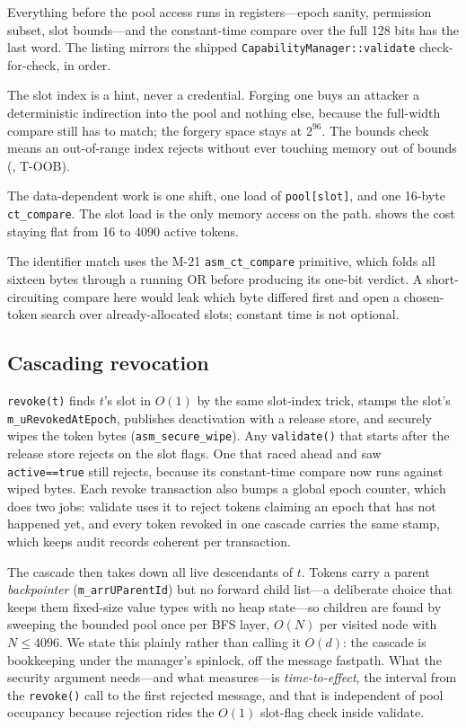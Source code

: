 \noindent
Everything before the pool access runs in registers---epoch sanity,
permission subset, slot bounds---and the constant-time compare over
the full 128 bits has the last word. The listing mirrors the shipped
\texttt{CapabilityManager::validate} check-for-check, in order.

The slot index is a hint, never a credential. Forging one buys an
attacker a deterministic indirection into the pool and nothing else,
because the full-width compare still has to match; the forgery space
stays at $2^{96}$. The bounds check means an out-of-range index
rejects without ever touching memory out of bounds
(, T-OOB).

The data-dependent work is one shift, one load of
\texttt{pool[slot]}, and one 16-byte \texttt{ct\_compare}. The slot
load is the only memory access on the path.
 shows the cost staying flat from 16 to 4090
active tokens.

The identifier match uses the M-21 \texttt{asm\_ct\_compare}
primitive, which folds all sixteen bytes through a running OR before
producing its one-bit verdict. A short-circuiting compare here would
leak which byte differed first and open a chosen-token search over
already-allocated slots; constant time is not optional.

\subsection{Cascading revocation}
\label{sec:design:revoke}

\texttt{revoke(t)} finds $t$'s slot in $O(1)$ by the same slot-index
trick, stamps the slot's \texttt{m\_uRevokedAtEpoch}, publishes
deactivation with a release store, and securely wipes the token bytes
(\texttt{asm\_secure\_wipe}). Any \texttt{validate()} that starts
after the release store rejects on the slot flags. One that raced
ahead and saw \texttt{active==true} still rejects, because its
constant-time compare now runs against wiped bytes. Each revoke
transaction also bumps a global epoch counter, which does two jobs:
validate uses it to reject tokens claiming an epoch that has not
happened yet, and every token revoked in one cascade carries the same
stamp, which keeps audit records coherent per transaction.

The cascade then takes down all live descendants of $t$. Tokens carry
a parent \emph{backpointer} (\texttt{m\_arrUParentId}) but no forward
child list---a deliberate choice that keeps them fixed-size value
types with no heap state---so children are found by sweeping the
bounded pool once per BFS layer, $O(N)$ per visited node with
$N \le 4096$. We state this plainly rather than calling it $O(d)$:
the cascade is bookkeeping under the manager's spinlock, off the
message fastpath. What the security argument needs---and what
 measures---is \emph{time-to-effect}, the
interval from the \texttt{revoke()} call to the first rejected
message, and that is independent of pool occupancy because rejection
rides the $O(1)$ slot-flag check inside validate.

